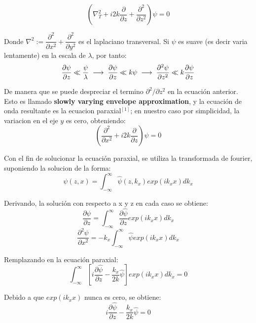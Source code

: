 \documentclass[11pt,letterpaper,twocolumn]{article}
\begin{document}
$$\left( \nabla^{2}_{T} + \textit{i}2k \dfrac{\partial}{\partial z}+\dfrac{\partial^{2}}{\partial z^{2}} \right)\psi=0$$ 
\par 
Donde $\nabla^{2}:=\dfrac{\partial^{2}}{\partial x^{2}}+\dfrac{\partial^{2}}{\partial y^{2}}$ es el laplaciano transversal. Si $\psi$ es suave (es decir varia lentamente) en la escala de $\lambda$, por tanto:\\
$$\dfrac{\partial \psi}{\partial z} \ll \dfrac{\psi}{\lambda} \hspace*{0.1cm} \longrightarrow \hspace*{0.1cm} \dfrac{\partial \psi}{\partial z} \ll k \psi \hspace*{0.1cm} \longrightarrow \hspace*{0.1cm} \dfrac{\partial^{2} \psi}{\partial z^{2}} \ll k \dfrac{\partial \psi}{\partial z}$$
\par 
De manera que se puede despreciar el termino $\partial^{2}/{\partial z^{2}}$ en la ecuación anterior. Esto es llamado \textbf{slowly varying envelope approximation}, y la ecuación de onda resultante es la ecuacion paraxial$^{[1]}$; en nuestro caso por simplicidad, la variacion en el eje $y$ es cero, obteniendo: 
\begin{equation}
\left( \dfrac{\partial^{2}}{\partial x^{2}} + \textit{i}2k \dfrac{\partial}{\partial z}\right)\psi=0
\end{equation}
\par 
Con el fin de solucionar la ecuación paraxial, se utiliza la transformada de fourier, suponiendo la solucion de la forma: 
\begin{equation}
\psi(z,x)= \int_{-\infty}^{\infty} \hat{\psi}(z,k_{x}) exp(ik_{x}x) dk_{x}
\end{equation}
\par 
Derivando, la solución con respecto a x y z en cada caso se obtiene:  
$$\dfrac{\partial \psi}{\partial z}=  \int_{-\infty}^{\infty} \dfrac{\partial \hat{\psi}}{\partial z} exp(ik_{x}x) dk_{x}$$
$$\dfrac{\partial^{2} \psi}{\partial x^{2}}= -k_{x} \int_{-\infty}^{\infty} \hat{\psi} exp(ik_{x}x) dk_{x}$$
\par 
Remplazando en la ecuación paraxial: 
$$\int_{-\infty}^{\infty} \left[ \textit{i} \dfrac{\partial \hat{\psi}}{\partial z} -\dfrac{k_{x}}{2k}  \hat{\psi} \right] exp(ik_{x}x) dk_{x}=0$$
\par 
Debido a que $ exp(ik_{x}x)$ nunca es cero, se obtiene: 
$$\textit{i} \dfrac{\partial \hat{\psi}}{\partial z} -\dfrac{k_{x}}{2k}  \hat{\psi}=0$$
\par 
\end{document}
